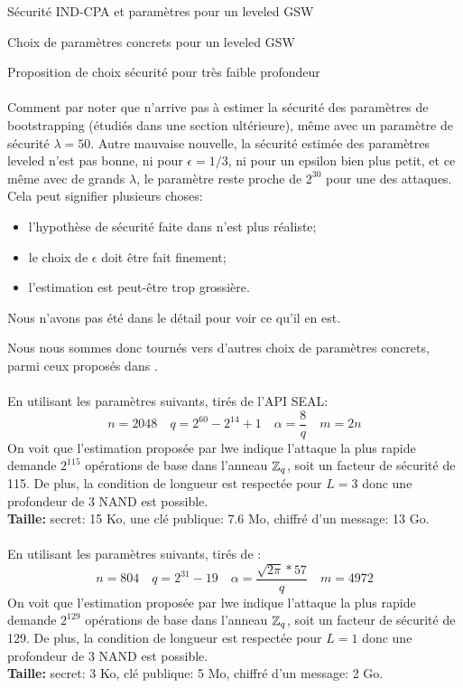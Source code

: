 \begin{section}{Sécurité IND-CPA et paramètres pour un leveled GSW}
\begin{subsection}{Choix de paramètres concrets pour un leveled GSW}
\begin{subsubsection}{Proposition de choix sécurité pour très faible profondeur}
\paragraph{}

Comment par noter que  n'arrive pas à estimer la sécurité des paramètres de bootstrapping (étudiés
dans une section ultérieure), même 
avec un paramètre de sécurité $\lambda = 50$. Autre mauvaise nouvelle, la sécurité estimée des paramètres leveled
n'est pas bonne, ni pour $\epsilon = 1/3$, ni pour un epsilon bien plus petit, et ce même avec de grands $\lambda$, 
le paramètre  reste proche de $2^{30}$ pour une des attaques. Cela peut signifier plusieurs choses:
\begin{itemize}
\item l'hypothèse de sécurité faite dans \cite{halevi} n'est plus réaliste;
\item le choix de $\epsilon$ doit être fait finement;
\item l'estimation est peut-être trop grossière.
\end{itemize}
Nous n'avons pas été dans le détail pour voir ce qu'il en est.

Nous nous sommes donc tournés vers d'autres choix de paramètres concrets, parmi ceux proposés dans 
\cite{estimator}.

\paragraph{}
En utilisant les paramètres suivants, tirés de l'API SEAL: 
\[n = 2048\quad q = 2^{60} - 2^{14} + 1 \quad \alpha = \frac{8}{q}\quad m = 2n \] 
On voit que l'estimation proposée par lwe indique  l'attaque la plus rapide demande $2^{115}$
opérations de base dans l'anneau $\mathbb{Z}_q$, soit un facteur de sécurité de 115. De plus, la condition de longueur
est respectée pour $L=3$ donc une profondeur de 3 NAND est possible. \\ 
\textbf{Taille:} secret: 15 Ko, une clé publique: 7.6 Mo, chiffré d'un message: 13 Go.

\paragraph{}
En utilisant les paramètres suivants, tirés de \cite{cryptoeprint:2015:755}:
\[n = 804\quad  q = 2^{31} - 19\quad \alpha = \frac{\sqrt{2\pi}*57}{q} \quad m = 4972\]
On voit que l'estimation proposée par lwe indique  l'attaque la plus rapide demande $2^{129}$ opérations de base dans
l'anneau $\mathbb{Z}_q$, soit un facteur de sécurité de 129. De plus, la condition de longueur
est respectée pour $L=1$ donc une profondeur de 3 NAND est possible. \\ 
\textbf{Taille:} secret: 3 Ko, clé publique: 5 Mo, chiffré d'un message: 2 Go.
\end{subsubsection}
\end{subsection}
\end{section}

